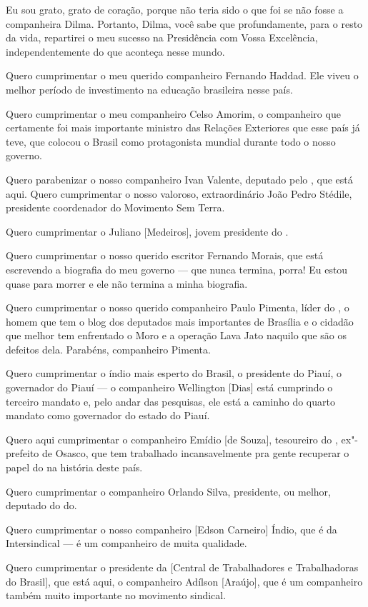 Eu sou grato, grato de coração, porque não teria sido o que foi se
não fosse a companheira Dilma. Portanto, Dilma, você sabe que
profundamente, para o resto da vida, repartirei o meu sucesso na
Presidência com Vossa Excelência, independentemente do que aconteça
nesse mundo.

Quero cumprimentar o meu querido companheiro Fernando Haddad. Ele
viveu o melhor período de investimento na educação brasileira nesse
país.

Quero cumprimentar o meu companheiro Celso Amorim, o companheiro
que certamente foi mais importante ministro das Relações Exteriores que
esse país já teve, que colocou o Brasil como protagonista mundial
durante todo o nosso governo.

Quero parabenizar o nosso companheiro Ivan Valente, deputado pelo
, que está aqui. Quero cumprimentar o nosso valoroso,
extraordinário João Pedro Stédile, presidente coordenador do Movimento
Sem Terra.

Quero cumprimentar o Juliano [Medeiros], jovem presidente do .

Quero cumprimentar o nosso querido escritor Fernando Morais,
que está escrevendo a biografia do meu governo --- que nunca termina,
porra! Eu estou quase para morrer e ele não termina a minha biografia.

Quero cumprimentar o nosso querido companheiro Paulo Pimenta,
líder do , o homem que tem o blog dos deputados mais importantes de
Brasília e o cidadão que melhor tem enfrentado o Moro e a operação Lava
Jato naquilo que são os defeitos dela. Parabéns, companheiro Pimenta.

Quero cumprimentar o índio mais esperto do Brasil, o presidente do
Piauí, o governador do Piauí --- o companheiro Wellington [Dias]
está cumprindo o terceiro mandato e, pelo andar das pesquisas, ele está
a caminho do quarto mandato como governador do estado do
Piauí.

Quero aqui cumprimentar o companheiro Emídio [de Souza],
tesoureiro do , ex"-prefeito de Osasco, que tem trabalhado
incansavelmente pra gente recuperar o papel do  na história deste
país.

Quero cumprimentar o companheiro Orlando Silva, presidente, ou
melhor, deputado do do.

Quero cumprimentar o nosso companheiro [Edson Carneiro] Índio,
que é da Intersindical --- é um companheiro de muita qualidade.

Quero cumprimentar o presidente da  [Central de Trabalhadores
e Trabalhadoras do Brasil], que está aqui, o companheiro Adílson
[Araújo], que é um companheiro também muito importante no movimento
sindical.


